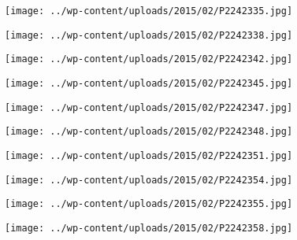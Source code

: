  

\begin{center} \texttt{[image: ../wp-content/uploads/2015/02/P2242335.jpg]} \end{center}

 

\begin{center} \texttt{[image: ../wp-content/uploads/2015/02/P2242338.jpg]} \end{center}

 

\begin{center} \texttt{[image: ../wp-content/uploads/2015/02/P2242342.jpg]} \end{center}

 

\begin{center} \texttt{[image: ../wp-content/uploads/2015/02/P2242345.jpg]} \end{center}

 

\begin{center} \texttt{[image: ../wp-content/uploads/2015/02/P2242347.jpg]} \end{center}

 

\begin{center} \texttt{[image: ../wp-content/uploads/2015/02/P2242348.jpg]} \end{center}

 

\begin{center} \texttt{[image: ../wp-content/uploads/2015/02/P2242351.jpg]} \end{center}



 

\begin{center} \texttt{[image: ../wp-content/uploads/2015/02/P2242354.jpg]} \end{center}



\begin{center} \texttt{[image: ../wp-content/uploads/2015/02/P2242355.jpg]} \end{center}

 

\begin{center} \texttt{[image: ../wp-content/uploads/2015/02/P2242358.jpg]} \end{center}

